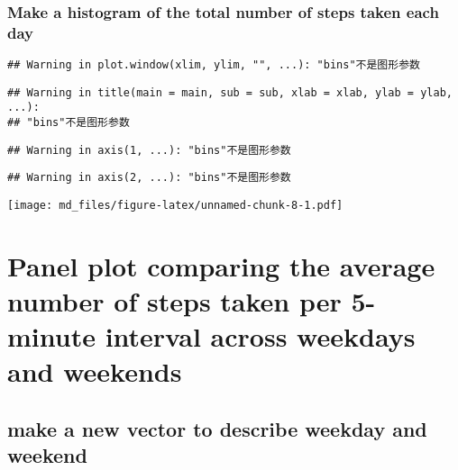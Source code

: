 \documentclass[]{article}
\newenvironment{Shaded}{\begin{snugshade}}{\end{snugshade}}
\newcommand{\KeywordTok}[1]{\textcolor[rgb]{0.13,0.29,0.53}{\textbf{#1}}}
\newcommand{\DataTypeTok}[1]{\textcolor[rgb]{0.13,0.29,0.53}{#1}}
\newcommand{\DecValTok}[1]{\textcolor[rgb]{0.00,0.00,0.81}{#1}}
\newcommand{\StringTok}[1]{\textcolor[rgb]{0.31,0.60,0.02}{#1}}
\newcommand{\OtherTok}[1]{\textcolor[rgb]{0.56,0.35,0.01}{#1}}
\newcommand{\OperatorTok}[1]{\textcolor[rgb]{0.81,0.36,0.00}{\textbf{#1}}}
\newcommand{\NormalTok}[1]{#1}
\begin{document}
\subsubsection{Make a histogram of the total number of steps taken each
day}\label{make-a-histogram-of-the-total-number-of-steps-taken-each-day}

\begin{Shaded}
\end{Shaded}

\begin{verbatim}
## Warning in plot.window(xlim, ylim, "", ...): "bins"不是图形参数
\end{verbatim}

\begin{verbatim}
## Warning in title(main = main, sub = sub, xlab = xlab, ylab = ylab, ...):
## "bins"不是图形参数
\end{verbatim}

\begin{verbatim}
## Warning in axis(1, ...): "bins"不是图形参数
\end{verbatim}

\begin{verbatim}
## Warning in axis(2, ...): "bins"不是图形参数
\end{verbatim}

\texttt{[image: md\_files/figure-latex/unnamed-chunk-8-1.pdf]}

\section{Panel plot comparing the average number of steps taken per
5-minute interval across weekdays and
weekends}\label{panel-plot-comparing-the-average-number-of-steps-taken-per-5-minute-interval-across-weekdays-and-weekends}

\subsection{make a new vector to describe weekday and
weekend}\label{make-a-new-vector-to-describe-weekday-and-weekend}
\end{document}

